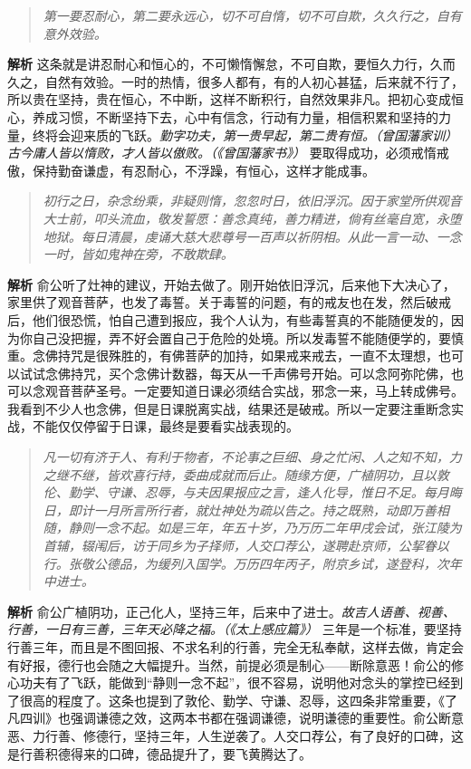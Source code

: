 \begin{quote}\it
    第一要忍耐心，第二要永远心，切不可自惰，切不可自欺，久久行之，自有意外效验。
\end{quote}

\textbf{解析} 这条就是讲忍耐心和恒心的，不可懒惰懈怠，不可自欺，要恒久力行，久而久之，自然有效验。一时的热情，很多人都有，有的人初心甚猛，后来就不行了，所以贵在坚持，贵在恒心，不中断，这样不断积行，自然效果非凡。把初心变成恒心，养成习惯，不断坚持下去，心中有信念，行动有力量，相信积累和坚持的力量，终将会迎来质的飞跃。\textit{勤字功夫，第一贵早起，第二贵有恒。（曾国藩家训）} \textit{古今庸人皆以惰败，才人皆以傲败。（《曾国藩家书》）} 要取得成功，必须戒惰戒傲，保持勤奋谦虚，有忍耐心，不浮躁，有恒心，这样才能成事。

\begin{quote}\it
    初行之日，杂念纷乘，非疑则惰，忽忽时日，依旧浮沉。因于家堂所供观音大士前，叩头流血，敬发誓愿：善念真纯，善力精进，倘有丝毫自宽，永堕地狱。每日清晨，虔诵大慈大悲尊号一百声以祈阴相。从此一言一动、一念一时，皆如鬼神在旁，不敢欺肆。
\end{quote}

\textbf{解析} 俞公听了灶神的建议，开始去做了。刚开始依旧浮沉，后来他下大决心了，家里供了观音菩萨，也发了毒誓。关于毒誓的问题，有的戒友也在发，然后破戒后，他们很恐慌，怕自己遭到报应，我个人认为，有些毒誓真的不能随便发的，因为你自己没把握，弄不好会置自己于危险的处境。所以发毒誓不能随便学的，要慎重。念佛持咒是很殊胜的，有佛菩萨的加持，如果戒来戒去，一直不太理想，也可以试试念佛持咒，买个念佛计数器，每天从一千声佛号开始。可以念阿弥陀佛，也可以念观音菩萨圣号。一定要知道日课必须结合实战，邪念一来，马上转成佛号。我看到不少人也念佛，但是日课脱离实战，结果还是破戒。所以一定要注重断念实战，不能仅仅停留于日课，最终是要看实战表现的。

\begin{quote}\it
    凡一切有济于人、有利于物者，不论事之巨细、身之忙闲、人之知不知，力之继不继，皆欢喜行持，委曲成就而后止。随缘方便，广植阴功，且以敦伦、勤学、守谦、忍辱，与夫因果报应之言，逢人化导，惟日不足。每月晦日，即计一月所言所行者，就灶神处为疏以告之。持之既熟，动即万善相随，静则一念不起。如是三年，年五十岁，乃万历二年甲戌会试，张江陵为首辅，辍闱后，访于同乡为子择师，人交口荐公，遂聘赴京师，公挈眷以行。张敬公德品，为缓列入国学。万历四年丙子，附京乡试，遂登科，次年中进士。
\end{quote}

\textbf{解析} 俞公广植阴功，正己化人，坚持三年，后来中了进士。\textit{故吉人语善、视善、行善，一日有三善，三年天必降之福。（《太上感应篇》）} 三年是一个标准，要坚持行善三年，而且是不图回报、不求名利的行善，完全无私奉献，这样去做，肯定会有好报，德行也会随之大幅提升。当然，前提必须是制心——断除意恶！俞公的修心功夫有了飞跃，能做到“静则一念不起”，很不容易，说明他对念头的掌控已经到了很高的程度了。这条也提到了敦伦、勤学、守谦、忍辱，这四条非常重要，《了凡四训》也强调谦德之效，这两本书都在强调谦德，说明谦德的重要性。俞公断意恶、力行善、修德行，坚持三年，人生逆袭了。人交口荐公，有了良好的口碑，这是行善积德得来的口碑，德品提升了，要飞黄腾达了。

